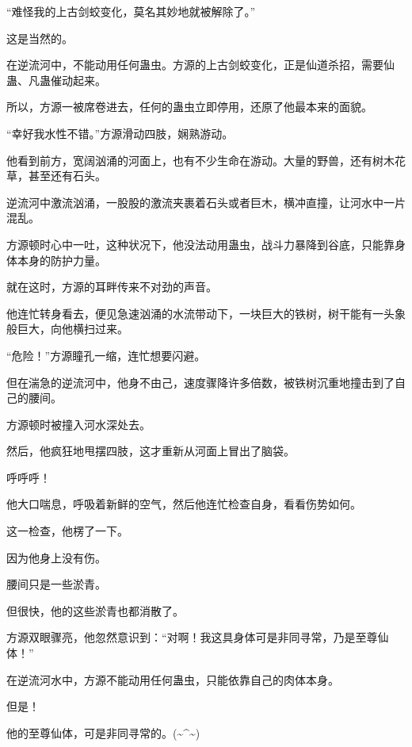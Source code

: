 \begin{this_body}
“难怪我的上古剑蛟变化，莫名其妙地就被解除了。”

这是当然的。

在逆流河中，不能动用任何蛊虫。方源的上古剑蛟变化，正是仙道杀招，需要仙蛊、凡蛊催动起来。

所以，方源一被席卷进去，任何的蛊虫立即停用，还原了他最本来的面貌。

“幸好我水性不错。”方源滑动四肢，娴熟游动。

他看到前方，宽阔汹涌的河面上，也有不少生命在游动。大量的野兽，还有树木花草，甚至还有石头。

逆流河中激流汹涌，一股股的激流夹裹着石头或者巨木，横冲直撞，让河水中一片混乱。

方源顿时心中一吐，这种状况下，他没法动用蛊虫，战斗力暴降到谷底，只能靠身体本身的防护力量。

就在这时，方源的耳畔传来不对劲的声音。

他连忙转身看去，便见急速汹涌的水流带动下，一块巨大的铁树，树干能有一头象般巨大，向他横扫过来。

“危险！”方源瞳孔一缩，连忙想要闪避。

但在湍急的逆流河中，他身不由己，速度骤降许多倍数，被铁树沉重地撞击到了自己的腰间。

方源顿时被撞入河水深处去。

然后，他疯狂地甩摆四肢，这才重新从河面上冒出了脑袋。

呼呼呼！

他大口喘息，呼吸着新鲜的空气，然后他连忙检查自身，看看伤势如何。

这一检查，他楞了一下。

因为他身上没有伤。

腰间只是一些淤青。

但很快，他的这些淤青也都消散了。

方源双眼骤亮，他忽然意识到：“对啊！我这具身体可是非同寻常，乃是至尊仙体！”

在逆流河水中，方源不能动用任何蛊虫，只能依靠自己的肉体本身。

但是！

他的至尊仙体，可是非同寻常的。(\~{}\^{}\~{})

\end{this_body}

